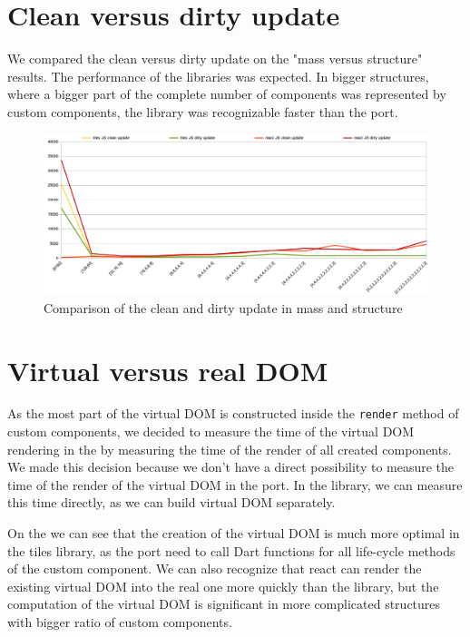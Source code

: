 \section{Clean versus dirty update}\label{sec:benchmarks-clean-vs-dirty-update}

	We compared the clean versus dirty update on the "mass versus structure" results. 
  The performance of the libraries was expected. 
	In bigger structures, where a bigger part of the complete number of components was represented by custom components, 
	the \tiles library was recognizable faster than the \react port.

	\begin{figure}[h]
	\centering  
		\includegraphics[scale=0.5]{images/benchmarks/mvs_dirty_vs_clean_update.png}
		\caption{Comparison of the clean and dirty update in mass and structure}
		\label{img:benchmarks-mass-vs-structure-dirty-vs-clean-update}
	\end{figure}


\section{Virtual versus real DOM}\label{sec:benchmarks-clean-vs-dirty-update}

	As the most part of the virtual DOM is constructed inside the \texttt{render} method of custom components, 
	we decided to measure the time of the virtual DOM rendering in the \react by measuring the time of the render of all created components.
	We made this decision because we don't have a direct possibility to measure the time of the render of the virtual DOM in the \react port.
	In the \tiles library, we can measure this time directly, as we can build virtual DOM separately.

	On the  we can see that the creation of the virtual DOM is much more optimal in the tiles library, 
	as the \react port need to call Dart functions for all life-cycle methods of the custom component.
	We can also recognize that react can render the existing virtual DOM into the real one more quickly than the \tiles library, 
	but the computation of the virtual DOM is significant in more complicated structures with bigger ratio of custom components.

